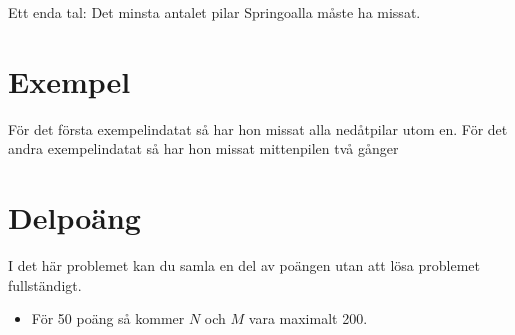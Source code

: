 Ett enda tal: Det minsta antalet pilar Springoalla måste ha missat.

\section*{Exempel}

För det första exempelindatat så har hon missat alla nedåtpilar utom en.  För
det andra exempelindatat så har hon missat mittenpilen två gånger

\section*{Delpoäng}

I det här problemet kan du samla en del av poängen utan att
lösa problemet fullständigt.

\begin{itemize}
    \item För 50 poäng så kommer $N$ och $M$ vara maximalt 200.
\end{itemize}

